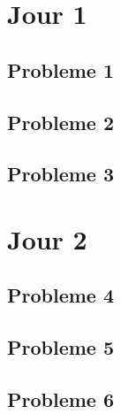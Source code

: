 \documentclass[12pt,a4paper,article]{memoir}
\begin{document}
\section{Jour 1}
\subsection{Probleme 1}



\subsection{Probleme 2}
\subsection{Probleme 3}

\section{Jour 2}
\subsection{Probleme 4}
\subsection{Probleme 5}
\subsection{Probleme 6}
\end{document}
